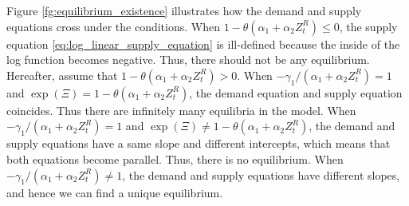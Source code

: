\documentclass[11pt, a4paper]{article}
\begin{document}
Figure \ref{fg:equilibrium_existence} illustrates how the demand and supply equations cross under the conditions.
When $1- \theta(\alpha_1 + \alpha_2 Z^{R}_{t}) \le 0$, the supply equation \eqref{eq:log_linear_supply_equation} is ill-defined because the inside of the log function becomes negative.
Thus, there should not be any equilibrium.
Hereafter, assume that $1- \theta(\alpha_1 + \alpha_2 Z^{R}_{t}) > 0$.
When $-\gamma_1/(\alpha_1 + \alpha_2 Z^{R}_{t}) = 1$ and $\exp(\Xi) = 1- \theta(\alpha_1 + \alpha_2 Z^{R}_{t})$, the demand equation and supply equation coincides.
Thus there are infinitely many equilibria in the model.
When $-\gamma_1/(\alpha_1 + \alpha_2 Z^{R}_{t}) = 1$ and $\exp(\Xi) \ne 1- \theta(\alpha_1 + \alpha_2 Z^{R}_{t})$, the demand and supply equations have a same slope and different intercepts, which means that both equations become parallel.
Thus, there is no equilibrium.
When $-\gamma_1/(\alpha_1 + \alpha_2 Z^{R}_{t}) \ne 1$, the demand and supply equations have different slopes, and hence we can find a unique equilibrium. 
\end{document}
